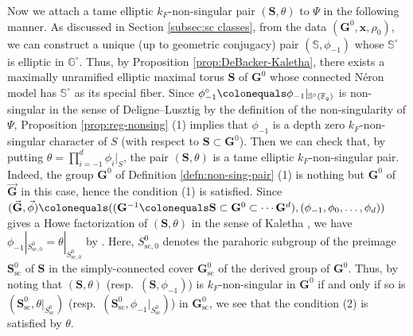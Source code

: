 \documentclass{amsart}
\renewcommand{\sc}{\mathrm{sc}}
\newcommand{\x}{\mathbf{x}}
\newcommand{\F}{\mathbb{F}}
\newcommand{\bbS}{\mathbb{S}}
\newcommand{\bbG}{\mathbb{G}}
\newcommand{\bfG}{\mathbf{G}}
\newcommand{\bfS}{\mathbf{S}}
\theoremstyle{plain}
\theoremstyle{definition}
\theoremstyle{remark}
\theoremstyle{theorem}
\begin{document}
Now we attach a tame elliptic $k_{F}$-non-singular pair $(\bfS,\theta)$ to $\Psi$ in the following manner.
As discussed in Section \ref{subsec:sc classes}, from the data $(\bfG^{0},\x,\rho_{0})$, we can construct a unique (up to geometric conjugacy) pair $(\bbS,\phi_{-1})$ whose $\bbS^{\circ}$ is elliptic in $\bbG^{\circ}$.
Thus, by Proposition \ref{prop:DeBacker-Kaletha}, there exists a maximally unramified elliptic maximal torus  $\bfS$ of $\bfG^{0}$ whose connected N\'eron model has $\bbS^{\circ}$ as its special fiber.
Since $\phi_{-1}^{\circ}\colonequals \phi_{-1}|_{\bbS^{\circ}(\F_{q})}$ is non-singular in the sense of Deligne--Lusztig by the definition of the non-singularity of $\Psi$, Proposition \ref{prop:reg-nonsing} (1) implies that $\phi_{-1}$ is a depth zero $k_{F}$-non-singular character of $S$ (with respect to $\bfS\subset\bfG^{0}$).
Then we can check that, by putting $\theta=\prod_{i=-1}^{d}\phi_{i}|_{S}$, the pair $(\bfS,\theta)$ is a tame elliptic $k_{F}$-non-singular pair.
Indeed, the group $\bfG^{0}$ of Definition \ref{defn:non-sing-pair} (1) is nothing but $\bfG^{0}$ of $\vec{\bfG}$ in this case, hence the condition (1) is satisfied.
Since $(\vec{\bfG},\vec{\phi})\colonequals ((\bfG^{-1}\colonequals \bfS\subset\bfG^{0}\subset\cdots\bfG^{d}),(\phi_{-1},\phi_{0},\ldots,\phi_{d}))$ gives a Howe factorization of $(\bfS,\theta)$ in the sense of Kaletha \cite[Definition 3.6.2]{Kal19}, we have $\phi_{-1}|_{S_{\sc,0}^{0}}=\theta|_{S_{\sc,0}^{0}}$ by \cite[Fact 3.6.4]{Kal19}.
Here, $S_{\sc,0}^{0}$ denotes the parahoric subgroup of the preimage $\bfS_{\sc}^{0}$ of $\bfS$ in the simply-connected cover $\bfG^{0}_{\sc}$ of the derived group of $\bfG^{0}$.
Thus, by noting that $(\bfS,\theta)$ (resp.\ $(\bfS,\phi_{-1})$) is $k_{F}$-non-singular in $\bfG^{0}$ if and only if so is $(\bfS_{\sc}^{0},\theta|_{S_{\sc}^{0}})$ (resp.\ $(\bfS_{\sc}^{0},\phi_{-1}|_{S_{\sc}^{0}})$) in $\bfG^{0}_{\sc}$, we see that the condition (2) is satisfied by $\theta$.
\end{document}
